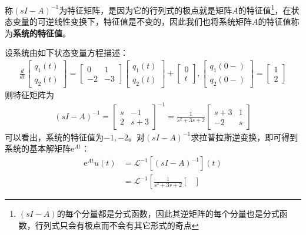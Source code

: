 \documentclass{ctexbook}
\begin{document}
称$(sI-A)^{-1}$为特征矩阵，是因为它的行列式的极点就是矩阵$A$的特征值\footnote{$(sI-A)$的每个分量都是分式函数，因此其逆矩阵的每个分量也是分式函数，行列式只会有极点而不会有其它形式的奇点}，在状态变量的可逆线性变换下，特征值是不变的，因此我们也将系统矩阵$A$的特征值称为\textbf{系统的特征值}。

\begin{example}
    设系统由如下状态变量方程描述：
    \begin{align*}
        \frac{d}{dt}\begin{bmatrix}
            q_1(t)\\
            q_2(t)
        \end{bmatrix}=\begin{bmatrix}
            0 & 1\\
            -2 & -3
        \end{bmatrix}\begin{bmatrix}
            q_1(t)\\
            q_2(t)
        \end{bmatrix}+\begin{bmatrix}
            0\\
            t
        \end{bmatrix},\begin{bmatrix}
            q_1(0-)\\
            q_2(0-)
        \end{bmatrix}=\begin{bmatrix}
            1\\
            2
        \end{bmatrix}
    \end{align*}
    则特征矩阵为\begin{align*}
        (sI-A)^{-1}=\begin{bmatrix}
            s & -1\\
            2 & s+3
        \end{bmatrix}^{-1}=\frac{1}{s^2+3s+2}\begin{bmatrix}
            s+3 & 1\\
            -2 & s
        \end{bmatrix}
    \end{align*}
    可以看出，系统的特征值为$-1,-2$。对$(sI-A)^{-1}$求拉普拉斯逆变换，即可得到系统的基本解矩阵$\mathrm{e}^{At}$：\begin{align*}
        \mathrm{e}^{At}u(t)&=\mathcal{L} ^{-1} \left[(sI-A)^{-1}\right](t)\\
        &=\mathcal{L} ^{-1} \left[\frac{1}{s^2+3s+2}\begin{bmatrix}

\end{bmatrix}
\end{align*}
\end{example}
\end{document}
